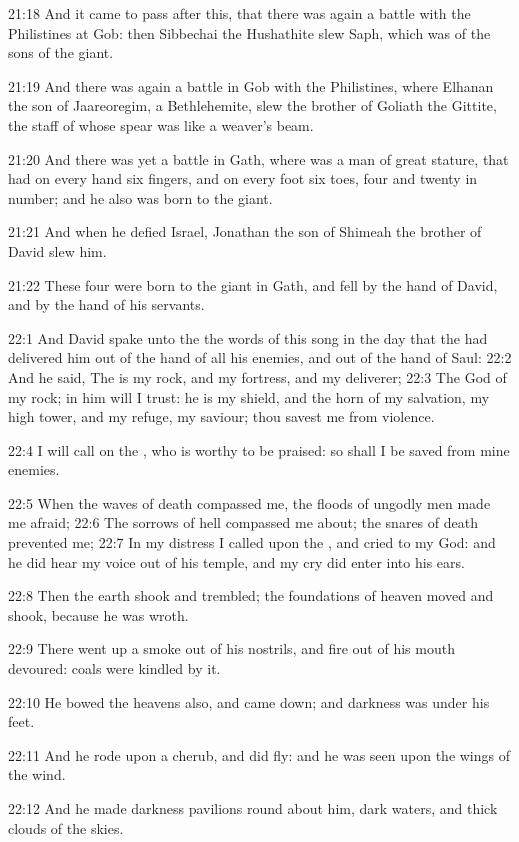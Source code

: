 21:18 And it came to pass after this, that there was again a battle
with the Philistines at Gob: then Sibbechai the Hushathite slew Saph,
which was of the sons of the giant.

21:19 And there was again a battle in Gob with the Philistines, where
Elhanan the son of Jaareoregim, a Bethlehemite, slew the brother of
Goliath the Gittite, the staff of whose spear was like a weaver's
beam.

21:20 And there was yet a battle in Gath, where was a man of great
stature, that had on every hand six fingers, and on every foot six
toes, four and twenty in number; and he also was born to the giant.

21:21 And when he defied Israel, Jonathan the son of Shimeah the
brother of David slew him.

21:22 These four were born to the giant in Gath, and fell by the hand
of David, and by the hand of his servants.

22:1 And David spake unto the \LORD the words of this song in the day
that the \LORD had delivered him out of the hand of all his enemies,
and out of the hand of Saul: 22:2 And he said, The \LORD is my rock,
and my fortress, and my deliverer; 22:3 The God of my rock; in him
will I trust: he is my shield, and the horn of my salvation, my high
tower, and my refuge, my saviour; thou savest me from violence.

22:4 I will call on the \LORD, who is worthy to be praised: so shall I
be saved from mine enemies.

22:5 When the waves of death compassed me, the floods of ungodly men
made me afraid; 22:6 The sorrows of hell compassed me about; the
snares of death prevented me; 22:7 In my distress I called upon the
\LORD, and cried to my God: and he did hear my voice out of his temple,
and my cry did enter into his ears.

22:8 Then the earth shook and trembled; the foundations of heaven
moved and shook, because he was wroth.

22:9 There went up a smoke out of his nostrils, and fire out of his
mouth devoured: coals were kindled by it.

22:10 He bowed the heavens also, and came down; and darkness was under
his feet.

22:11 And he rode upon a cherub, and did fly: and he was seen upon the
wings of the wind.

22:12 And he made darkness pavilions round about him, dark waters, and
thick clouds of the skies.

